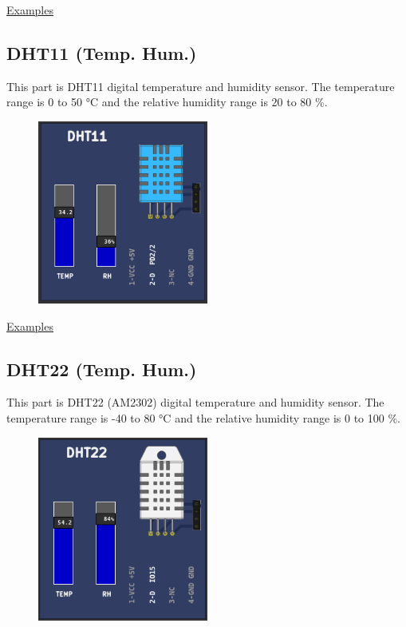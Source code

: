 \href{https://lcgamboa.github.io/picsimlab_examples/parts_BMP280_(Pressure_I2C).html}{Examples}

\vspace{0.5cm}

\subsection{DHT11 (Temp. Hum.)} 

This part is DHT11 digital temperature and humidity sensor. The temperature  range is 0 to 50 °C  
and the relative humidity range is 20 to 80 \%.

\begin{figure}[H]
\center
\includegraphics[width=0.5\textwidth]{img/part_dht11.png} 
\end{figure} 


\href{https://lcgamboa.github.io/picsimlab_examples/parts_DHT11_(Temp._Hum.).html}{Examples}

\vspace{0.5cm}

\subsection{DHT22 (Temp. Hum.)} 

This part is DHT22 (AM2302) digital temperature and humidity sensor. The temperature  range is -40 to 80 °C  
and the relative humidity range is 0 to 100 \%.

\begin{figure}[H]
\center
\includegraphics[width=0.5\textwidth]{img/part_dht22.png} 
\end{figure} 


